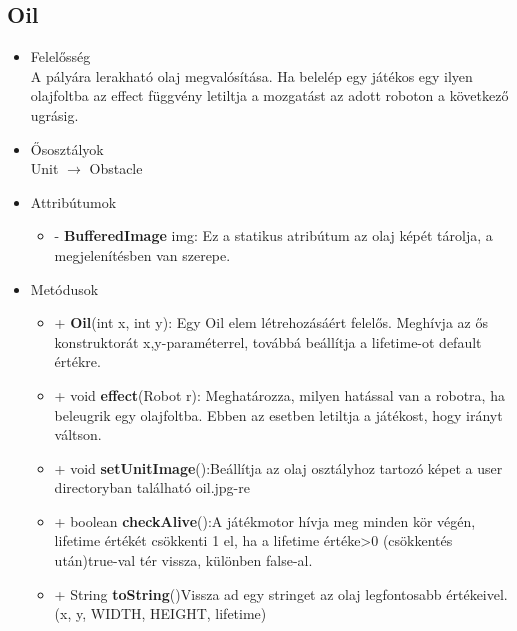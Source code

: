\subsection{Oil}
\begin{itemize}
\item Felelősség\\
A pályára lerakható olaj megvalósítása. Ha belelép egy játékos egy ilyen olajfoltba az effect függvény letiltja a mozgatást az adott roboton a következő ugrásig.
\item Ősosztályok\\
Unit $\rightarrow$ Obstacle 
\item Attribútumok
	\begin{itemize}
		\item- \textbf{BufferedImage} img: Ez a  statikus atribútum az olaj képét tárolja,  a megjelenítésben van szerepe.
	\end{itemize}
\item Metódusok
	\begin{itemize}
		\item + \textbf{Oil}(int x, int y): Egy Oil elem létrehozásáért felelős. Meghívja az ős konstruktorát x,y-paraméterrel, továbbá beállítja a lifetime-ot default értékre.
		\item + void \textbf{effect}(Robot r): Meghatározza, milyen hatással van a robotra, ha beleugrik egy olajfoltba. Ebben az esetben letiltja a játékost, hogy irányt váltson.
			\item + void \textbf{setUnitImage}():Beállítja az olaj osztályhoz tartozó képet a user directoryban található oil.jpg-re
				\item + boolean \textbf{checkAlive}():A játékmotor hívja meg minden kör végén, lifetime értékét csökkenti 1 el, ha a lifetime értéke>0 (csökkentés után)true-val tér vissza, különben false-al.
		\item + String \textbf{toString}()Vissza ad egy stringet az olaj legfontosabb értékeivel.(x, y, WIDTH, HEIGHT, lifetime)
	\end{itemize}
\end{itemize}

